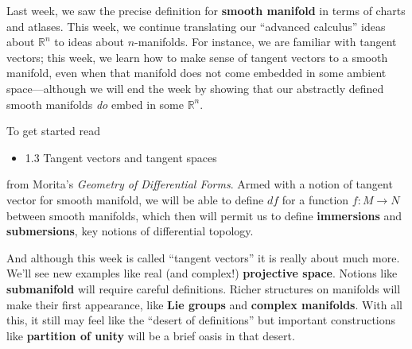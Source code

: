 \documentclass{homework}
\author{Jim Fowler}
\date{Week 2: Tangent vectors}
\begin{document}
\maketitle

Last week, we saw the precise definition for \textbf{smooth manifold}
in terms of charts and atlases.  This week, we continue translating
our ``advanced calculus'' ideas about $\mathbb{R}^n$ to ideas about
$n$-manifolds.  For instance, we are familiar with tangent vectors;
this week, we learn how to make sense of tangent vectors to a smooth
manifold, even when that manifold does not come embedded in some
ambient space---although we will end the week by showing that our
abstractly defined smooth manifolds \textit{do} embed in some
$\mathbb{R}^n$.

To get started read
\begin{itemize}
\item 1.3 Tangent vectors and tangent spaces
\end{itemize}
from Morita's \textit{Geometry of Differential Forms}.  Armed with a
notion of tangent vector for smooth manifold, we will be able to
define $df$ for a function $f : M \to N$ between smooth manifolds,
which then will permit us to define \textbf{immersions} and
\textbf{submersions}, key notions of differential topology.

And although this week is called ``tangent vectors'' it is really
about much more.  We'll see new examples like real (and complex!)
\textbf{projective space}.  Notions like \textbf{submanifold} will
require careful definitions.  Richer structures on manifolds will make
their first appearance, like \textbf{Lie groups} and \textbf{complex
  manifolds}.  With all this, it still may feel like the ``desert of
definitions'' but important constructions like \textbf{partition of
  unity} will be a brief oasis in that desert.
\end{document}
